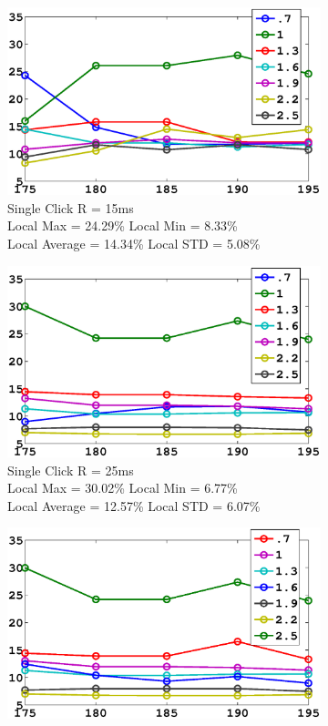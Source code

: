 \documentclass[conference]{IEEEtran}
\begin{document}
\begin{figure}[b!]
\begin{subfigure}{.5\textwidth}
  \centering
  \includegraphics[width=.8\linewidth]{15.eps}
  \caption{Single Click R = 15ms \\Local Max = 24.29\% Local Min = 8.33\% \\Local Average = 14.34\% Local STD = 5.08\%}
\centering
  \label{fig:sfig1}
\end{subfigure}%
\begin{subfigure}{.5\textwidth}
  \centering
  \includegraphics[width=.8\linewidth]{25.eps}
  \caption{Single Click R = 25ms \\Local Max = 30.02\% Local Min = 6.77\% \\Local Average = 12.57\% Local STD = 6.07\%}
  \label{fig:sfig2}
\end{subfigure}
\begin{subfigure}{.5\textwidth}
  \centering
  \includegraphics[width=.8\linewidth]{30.eps}

\end{subfigure}
\end{figure}
\end{document}
